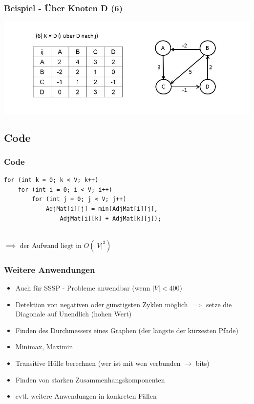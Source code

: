 
\begin{frame}
\frametitle{Beispiel - Über Knoten D (6)}

\includegraphics[width=\linewidth]{floyd_warshall_graphs/graph10.JPG}

\end{frame}


\subsection{Code}

\begin{frame}[fragile] %
\frametitle{Code}

\begin{lstlisting}
for (int k = 0; k < V; k++)
    for (int i = 0; i < V; i++)
        for (int j = 0; j < V; j++)
            AdjMat[i][j] = min(AdjMat[i][j],
                AdjMat[i][k] + AdjMat[k][j]);
\end{lstlisting}

~\\$\implies$ der Aufwand liegt in $O(|V|^3)$

\end{frame}


\begin{frame}
\frametitle{Weitere Anwendungen}
\begin{itemize}

\item Auch für SSSP - Probleme anwendbar (wenn $\vert V \vert < 400$)
\item Detektion von negativen oder günstigsten Zyklen möglich $\implies$ setze die Diagonale auf Unendlich (hohen Wert)
\item Finden des Durchmessers eines Graphen (der längste der kürzesten Pfade)
\item Minimax, Maximin
\item Transitive Hülle berechnen (wer ist mit wen verbunden $\rightarrow$ bits)
\item Finden von starken Zusammenhangskomponenten
\item evtl. weitere Anwendungen in konkreten Fällen
\end{itemize}
\end{frame}

